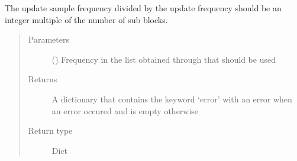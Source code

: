 \documentclass[letterpaper,10pt,english]{sphinxmanual}
\begin{document}
\begin{fulllineitems}
\begin{fulllineitems}
\sphinxAtStartPar
The update sample frequency divided by the update frequency should be an integer multiple of the number of sub blocks.
\begin{quote}\begin{description}
\item[{Parameters}] \leavevmode
\sphinxAtStartPar
{} () \textendash{} Frequency in the list obtained through  that should be used

\item[{Returns}] \leavevmode
\sphinxAtStartPar
A dictionary that contains the keyword ‘error’ with an error when an error occured and is empty otherwise

\item[{Return type}] \leavevmode
\sphinxAtStartPar
Dict

\end{description}\end{quote}

\end{fulllineitems}


\begin{fulllineitems}
\label{\detokenize{index:TiePieLCR_settings.TiePieLCR_settings.settings_dict}}
\end{fulllineitems}


\begin{fulllineitems}
\label{\detokenize{index:TiePieLCR_settings.TiePieLCR_settings.side_lob_n}}
\end{fulllineitems}



\end{fulllineitems}
\end{document}

